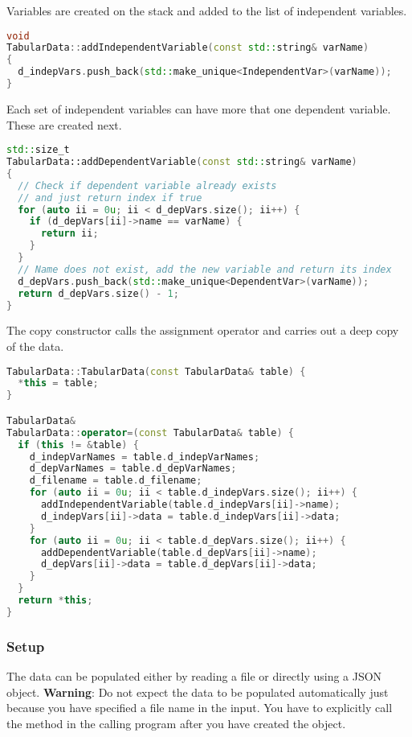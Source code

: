 Variables are created on the stack and added to the list
of independent variables.
\begin{lstlisting}[language=Cpp]
void
TabularData::addIndependentVariable(const std::string& varName)
{
  d_indepVars.push_back(std::make_unique<IndependentVar>(varName));
}
\end{lstlisting}

Each set of independent variables can have more that one dependent variable.
These are created next.
\begin{lstlisting}[language=Cpp]
std::size_t
TabularData::addDependentVariable(const std::string& varName)
{
  // Check if dependent variable already exists
  // and just return index if true
  for (auto ii = 0u; ii < d_depVars.size(); ii++) {
    if (d_depVars[ii]->name == varName) {
      return ii;
    }
  }
  // Name does not exist, add the new variable and return its index
  d_depVars.push_back(std::make_unique<DependentVar>(varName));
  return d_depVars.size() - 1;
}
\end{lstlisting}
The copy constructor calls the assignment operator and carries out a deep
copy of the data.
\begin{lstlisting}[language=Cpp]
TabularData::TabularData(const TabularData& table) {
  *this = table;
}

TabularData& 
TabularData::operator=(const TabularData& table) {
  if (this != &table) {
    d_indepVarNames = table.d_indepVarNames;
    d_depVarNames = table.d_depVarNames;
    d_filename = table.d_filename;
    for (auto ii = 0u; ii < table.d_indepVars.size(); ii++) {
      addIndependentVariable(table.d_indepVars[ii]->name);
      d_indepVars[ii]->data = table.d_indepVars[ii]->data;
    }
    for (auto ii = 0u; ii < table.d_depVars.size(); ii++) {
      addDependentVariable(table.d_depVars[ii]->name);
      d_depVars[ii]->data = table.d_depVars[ii]->data;
    }
  }
  return *this;
}
\end{lstlisting}

\subsubsection{Setup}
The  data can be populated either by reading a file or
directly using a JSON object.  {\Red \textbf{Warning}: Do not expect the 
data to be populated automatically just because you have specified a file name in the input.}
You have to explicitly call the  method in the calling program
after you have created the  object.

